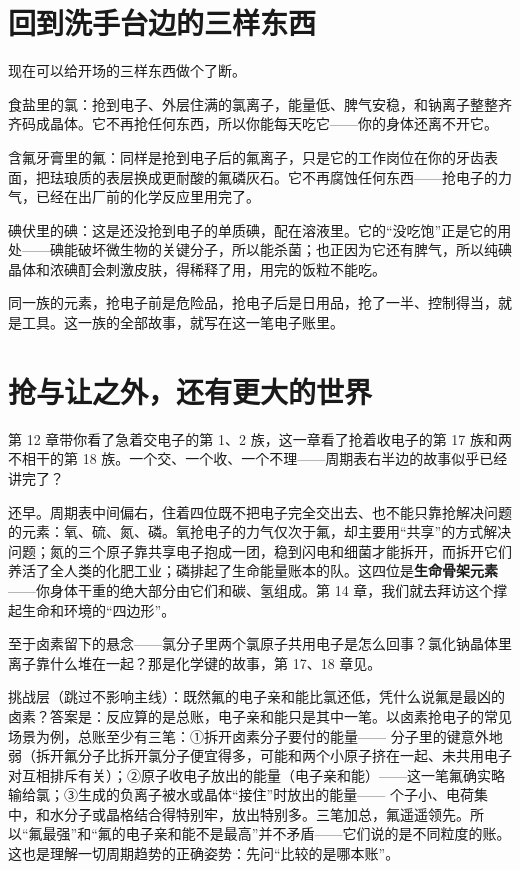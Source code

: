 \section{回到洗手台边的三样东西}

现在可以给开场的三样东西做个了断。

食盐里的氯：抢到电子、外层住满的氯离子，能量低、脾气安稳，和钠离子整整齐齐码成晶体。它不再抢任何东西，所以你能每天吃它——你的身体还离不开它。

含氟牙膏里的氟：同样是抢到电子后的氟离子，只是它的工作岗位在你的牙齿表面，把珐琅质的表层换成更耐酸的氟磷灰石。它不再腐蚀任何东西——抢电子的力气，已经在出厂前的化学反应里用完了。

碘伏里的碘：这是还没抢到电子的单质碘，配在溶液里。它的“没吃饱”正是它的用处——碘能破坏微生物的关键分子，所以能杀菌；也正因为它还有脾气，所以纯碘晶体和浓碘酊会刺激皮肤，得稀释了用，用完的饭粒不能吃。

同一族的元素，抢电子前是危险品，抢电子后是日用品，抢了一半、控制得当，就是工具。这一族的全部故事，就写在这一笔电子账里。

\section{抢与让之外，还有更大的世界}

第 12 章带你看了急着交电子的第 1、2 族，这一章看了抢着收电子的第 17 族和两不相干的第 18 族。一个交、一个收、一个不理——周期表右半边的故事似乎已经讲完了？

还早。周期表中间偏右，住着四位既不把电子完全交出去、也不能只靠抢解决问题的元素：氧、硫、氮、磷。氧抢电子的力气仅次于氟，却主要用“共享”的方式解决问题；氮的三个原子靠共享电子抱成一团，稳到闪电和细菌才能拆开，而拆开它们养活了全人类的化肥工业；磷排起了生命能量账本的队。这四位是\textbf{生命骨架元素}——你身体干重的绝大部分由它们和碳、氢组成。第 14 章，我们就去拜访这个撑起生命和环境的“四边形”。

至于卤素留下的悬念——氯分子里两个氯原子共用电子是怎么回事？氯化钠晶体里离子靠什么堆在一起？那是化学键的故事，第 17、18 章见。

\begin{tiaozhan}
挑战层（跳过不影响主线）：既然氟的电子亲和能比氯还低，凭什么说氟是最凶的卤素？答案是：反应算的是总账，电子亲和能只是其中一笔。以卤素抢电子的常见场景为例，总账至少有三笔：①拆开卤素分子要付的能量—— 分子里的键意外地弱（拆开氟分子比拆开氯分子便宜得多，可能和两个小原子挤在一起、未共用电子对互相排斥有关）；②原子收电子放出的能量（电子亲和能）——这一笔氟确实略输给氯；③生成的负离子被水或晶体“接住”时放出的能量—— 个子小、电荷集中，和水分子或晶格结合得特别牢，放出特别多。三笔加总，氟遥遥领先。所以“氟最强”和“氟的电子亲和能不是最高”并不矛盾——它们说的是不同粒度的账。这也是理解一切周期趋势的正确姿势：先问“比较的是哪本账”。
\end{tiaozhan}

